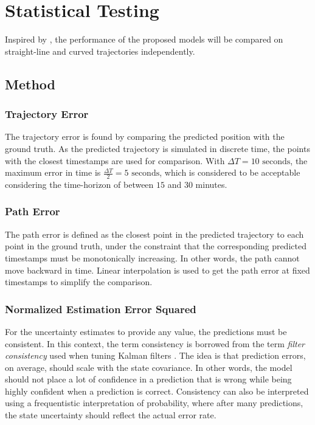 \chapter{Statistical Testing}\label{chap:stat_testing}
Inspired by \cite{hexeberg}, the performance of the proposed models will be compared on straight-line and curved trajectories independently.

\section{Method}
\subsection{Trajectory Error}
The trajectory error is found by comparing the predicted position with the ground truth. As the predicted trajectory is simulated in discrete time, the points with the closest timestamps are used for comparison. With $\Delta T = 10\text{ seconds}$, the maximum error in time is $\frac{\Delta T}{2} = 5 \text{ seconds}$, which is considered to be acceptable considering the time-horizon of between $15$ and $30$ minutes.
\subsection{Path Error}
The path error is defined as the closest point in the predicted trajectory to each point in the ground truth, under the constraint that the corresponding predicted timestamps must be monotonically increasing. In other words, the path cannot move backward in time. Linear interpolation is used to get the path error at fixed timestamps to simplify the comparison.

\subsection{Normalized Estimation Error Squared}
For the uncertainty estimates to provide any value, the predictions must be consistent. In this context, the term consistency is borrowed from the term \textit{filter consistency} used when tuning Kalman filters \cite{sensorfusjon}. The idea is that prediction errors, on average, should scale with the state covariance. In other words, the model should not place a lot of confidence in a prediction that is wrong while being highly confident when a prediction is correct. Consistency can also be interpreted using a frequentistic interpretation of probability, where after many predictions, the state uncertainty should reflect the actual error rate.

